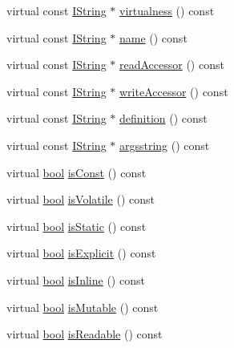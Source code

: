 \begin{DoxyCompactItemize}
virtual const \hyperlink{class_i_string}{I\+String} $\ast$ \hyperlink{class_member_handler_ae312556fdf2192f1adab20f67a4a1bd8}{virtualness} () const 
\item 
virtual const \hyperlink{class_i_string}{I\+String} $\ast$ \hyperlink{class_member_handler_ac1b6b03bb84160ffcf12d4db58ca3638}{name} () const 
\item 
virtual const \hyperlink{class_i_string}{I\+String} $\ast$ \hyperlink{class_member_handler_aaab8cc3144431eb44858e3a30101ec97}{read\+Accessor} () const 
\item 
virtual const \hyperlink{class_i_string}{I\+String} $\ast$ \hyperlink{class_member_handler_a520eb44457b1657718d84783d70d9dd0}{write\+Accessor} () const 
\item 
virtual const \hyperlink{class_i_string}{I\+String} $\ast$ \hyperlink{class_member_handler_a90deeb0c267a481d515c11d2466a1c1f}{definition} () const 
\item 
virtual const \hyperlink{class_i_string}{I\+String} $\ast$ \hyperlink{class_member_handler_a5c2127a10c691a60f8123fd2aa0b9854}{argsstring} () const 
\item 
virtual \hyperlink{qglobal_8h_a1062901a7428fdd9c7f180f5e01ea056}{bool} \hyperlink{class_member_handler_a8030220e6a73665c139c0bb87e9cf93a}{is\+Const} () const 
\item 
virtual \hyperlink{qglobal_8h_a1062901a7428fdd9c7f180f5e01ea056}{bool} \hyperlink{class_member_handler_a6851f37afdbd0e65765f806a0097c3f1}{is\+Volatile} () const 
\item 
virtual \hyperlink{qglobal_8h_a1062901a7428fdd9c7f180f5e01ea056}{bool} \hyperlink{class_member_handler_ab8ac175a058378bc2fcc2c44e4f0c996}{is\+Static} () const 
\item 
virtual \hyperlink{qglobal_8h_a1062901a7428fdd9c7f180f5e01ea056}{bool} \hyperlink{class_member_handler_af3e286d8e7e01f99c50497f94958ca7f}{is\+Explicit} () const 
\item 
virtual \hyperlink{qglobal_8h_a1062901a7428fdd9c7f180f5e01ea056}{bool} \hyperlink{class_member_handler_ad4eb904695a031a04789efed9ca8ae55}{is\+Inline} () const 
\item 
virtual \hyperlink{qglobal_8h_a1062901a7428fdd9c7f180f5e01ea056}{bool} \hyperlink{class_member_handler_a844cccaab696dffd2991d9969d5042e2}{is\+Mutable} () const 
\item 
virtual \hyperlink{qglobal_8h_a1062901a7428fdd9c7f180f5e01ea056}{bool} \hyperlink{class_member_handler_ad0ffaceb5067b0c59fce670e77389885}{is\+Readable} () const 
\item 

\end{DoxyCompactItemize}
